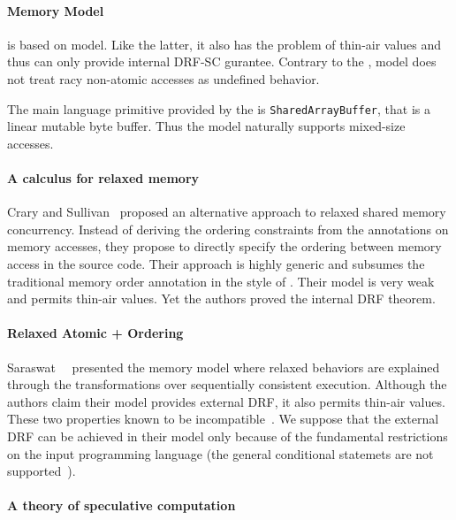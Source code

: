 \paragraph{\JS Memory Model}

\JSMM is based on \CMM model. 
Like the latter, it also has the problem of thin-air values
and thus can only provide internal DRF-SC gurantee. 
Contrary to the \CMM, \JS model does not treat 
racy non-atomic accesses as undefined behavior. 

The main language primitive provided by the \JSMM
is \texttt{SharedArrayBuffer}, that is a linear mutable byte buffer.
Thus the model naturally supports mixed-size accesses.

\paragraph{A calculus for relaxed memory}

Crary and Sullivan~\cite{Crary-Sullivan:POPL15} proposed 
an alternative approach to relaxed shared memory concurrency.
Instead of deriving the ordering constraints from the annotations 
on memory accesses, they propose to directly specify 
the ordering between memory access in the source code. 
Their approach is highly generic and subsumes 
the traditional memory order annotation in the style of \CMM.
Their model is very weak and permits thin-air values. 
Yet the authors proved the internal DRF theorem.

\paragraph{Relaxed Atomic + Ordering}

Saraswat~\etal~\cite{Saraswat-al:PPoPP07} presented the \RAO memory model
where relaxed behaviors are explained through the transformations 
over sequentially consistent execution.
Although the authors claim their model provides external DRF,
it also permits thin-air values. 
These two properties known to be incompatible~\cite{Batty-al:ESOP15}.
We suppose that the external DRF can be achieved in their model 
only because of the fundamental restrictions on the input programming language 
(\eg the general conditional statemets are not supported~\cite{PichonPharabod-Sewell:POPL16}). 

\paragraph{A theory of speculative computation}

